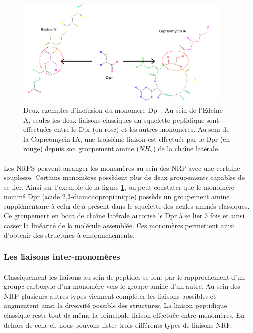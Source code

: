 \documentclass[12pt,french,twoside]{report}
\begin{document}
\begin{figure}[h!]
  \begin{center}
    \includegraphics[width=400px]{Figures/bio/Intro/Dpr/2-3_liaisons.png}
    \caption{\label{DPR_incl}Deux exemples d'inclusion du monomère Dp~:
    Au sein de l'Edeine A, seules les deux liaisons classiques du squelette peptidique sont effectuées entre le Dpr (en rose) et les autres monomères.
    Au sein de la Capreomycin IA, une troisième liaison est effectuée par le Dpr (en rouge) depuis son groupement amine ($NH_2$) de la chaîne latérale.}
  \end{center}
\end{figure}

\paragraph{}Les NRPS peuvent arranger les monomères au sein des NRP avec une certaine souplesse.
Certains monomères possèdent plus de deux groupements capables de se lier.
Ainsi sur l'exemple de la figure \ref{DPR_incl}, on peut constater que le monomère nommé Dpr (acide 2,3-diamonopropionique) possède un groupement amine supplémentaire à celui déjà présent dans le squelette des acides aminés classiques.
Ce groupement en bout de chaîne latérale autorise le Dpr à se lier 3 fois et ainsi casser la linéarité de la molécule assemblée.
Ces monomères permettent ainsi d'obtenir des structures à embranchements.


\subsubsection{Les liaisons inter-monomères}

\paragraph{}Classiquement les liaisons au sein de peptides se font par le rapprochement d'un groupe carboxyle d'un monomère vers le groupe amine d'un autre.
Au sein des NRP plusieurs autres types viennent compléter les liaisons possibles et augmentent ainsi la diversité possible des structures.
La liaison peptidique classique reste tout de même la principale liaison effectuée entre monomères.
En dehors de celle-ci, nous pouvons lister trois différents types de liaisons NRP.
\end{document}
